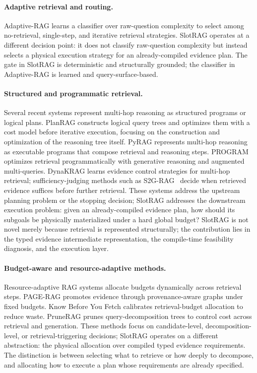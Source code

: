 \paragraph{Adaptive retrieval and routing.}
Adaptive-RAG \cite{adaptiverag} learns a classifier over raw-question complexity to select among no-retrieval, single-step, and iterative retrieval strategies. SlotRAG operates at a different decision point: it does not classify raw-question complexity but instead selects a physical execution strategy for an already-compiled evidence plan. The gate in SlotRAG is deterministic and structurally grounded; the classifier in Adaptive-RAG is learned and query-surface-based.

\paragraph{Structured and programmatic retrieval.}
Several recent systems represent multi-hop reasoning as structured programs or logical plans. PlanRAG \cite{planrag} constructs logical query trees and optimizes them with a cost model before iterative execution, focusing on the construction and optimization of the reasoning tree itself. PyRAG \cite{pyrag} represents multi-hop reasoning as executable programs that compose retrieval and reasoning steps. PROGRAM \cite{program} optimizes retrieval programmatically with generative reasoning and augmented multi-queries. DynaKRAG \cite{dynakrag} learns evidence control strategies for multi-hop retrieval; sufficiency-judging methods such as S2G-RAG~\cite{s2grag} decide when retrieved evidence suffices before further retrieval. These systems address the upstream planning problem or the stopping decision; SlotRAG addresses the downstream execution problem: given an already-compiled evidence plan, how should its subgoals be physically materialized under a hard global budget? SlotRAG is not novel merely because retrieval is represented structurally; the contribution lies in the typed evidence intermediate representation, the compile-time feasibility diagnosis, and the execution layer.

\paragraph{Budget-aware and resource-adaptive methods.}
Resource-adaptive RAG systems allocate budgets dynamically across retrieval steps. PAGE-RAG \cite{pagerag} promotes evidence through provenance-aware graphs under fixed budgets. Know Before You Fetch \cite{knowbeforeyoufetch} calibrates retrieval-budget allocation to reduce waste. PruneRAG \cite{prunerag} prunes query-decomposition trees to control cost across retrieval and generation. These methods focus on candidate-level, decomposition-level, or retrieval-triggering decisions; SlotRAG operates on a different abstraction: the physical allocation over compiled typed evidence requirements. The distinction is between selecting what to retrieve or how deeply to decompose, and allocating how to execute a plan whose requirements are already specified.


